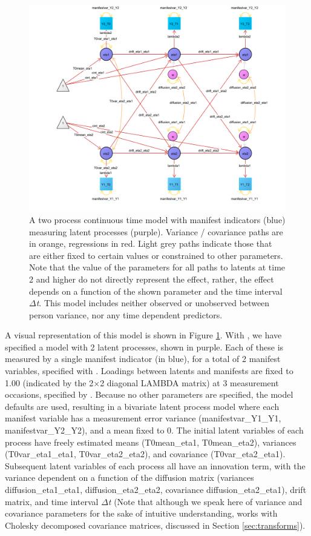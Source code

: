 \documentclass[nojss]{jss}\usepackage[]{graphicx}\usepackage[]{color}
\begin{document}
\begin{figure}[!p]
\includegraphics[width = \textwidth]{pathdiagramtwoprocessbasic}
\caption{ \label{fig:pathdiagramtwoprocessbasic} A two process continuous time model with manifest indicators (blue) measuring latent processes (purple). Variance / covariance paths are in orange, regressions in red. Light grey paths indicate those that are either fixed to certain values or constrained to other parameters. Note that the value of the parameters for all paths to latents at time 2 and higher do not directly represent the effect, rather, the effect depends on a function of the shown parameter and the time interval $\Delta$\textit{t}. This model includes neither observed or unobserved between person variance, nor any time dependent predictors. }
\end{figure}
A visual representation of this model is shown in Figure \ref{fig:pathdiagramtwoprocessbasic}. With , we have specified a model with 2 latent processes, shown in purple. Each of these is measured by a single manifest indicator (in blue), for a total of 2 manifest variables, specified with . Loadings between latents and manifests are fixed to 1.00 (indicated by the 2$\times$2 diagonal LAMBDA matrix) at 3 measurement occasions, specified by . Because no other parameters are specified, the model defaults are used, resulting in a bivariate latent process model where each manifest variable has a measurement error variance (manifestvar\_Y1\_Y1, manifestvar\_Y2\_Y2), and a mean fixed to 0. The initial latent variables of each process have freely estimated means (T0mean\_eta1, T0mean\_eta2), variances (T0var\_eta1\_eta1, T0var\_eta2\_eta2), and covariance (T0var\_eta2\_eta1). Subsequent latent variables of each process all have an innovation term, with the variance dependent on a function of the diffusion matrix (variances diffusion\_eta1\_eta1, diffusion\_eta2\_eta2, covariance diffusion\_eta2\_eta1), drift matrix, and time interval $\Delta$\textit{t} (Note that although we speak here of variance and covariance parameters for the sake of intuitive understanding,  works with Cholesky decomposed covariance matrices, discussed in Section \ref{sec:transforms}).
\end{document}

